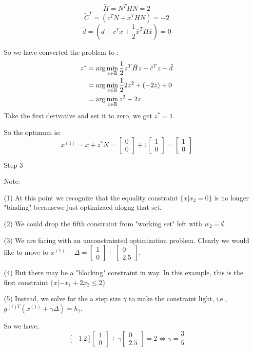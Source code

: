 $$\tilde{H} = N^THN = 2$$
$$\tilde{C}^T = (c^TN + \bar{x}^T HN)= -2$$
$$\tilde{d}= (d+c^Tx + \frac{1}{2}\bar{x}^TH\bar{x})=0$$


So we have converted the problem to :
\begin{align*}
z^* 
&= \arg\min_{z\in\mathbb{R}} \frac{1}{2} z^T\tilde{H}z + \tilde{c}^Tz + \tilde{d}\\
&= \arg\min_{z\in\mathbb{R}} \frac{1}{2}2z^2 + (-2z)+ 0\\
&= \arg\min_{z\in\mathbb{R}} z^2 - 2z
\end{align*}
Take the first derivative and set it to zero, we get $z^* = 1$.

So the optimum is:
\begin{equation*}
x^{(1)}= \bar{x}+ z^*N = 
\begin{bmatrix}
0\\
0
\end{bmatrix}
 + 1
\begin{bmatrix}
1\\
0
\end{bmatrix} = 
\begin{bmatrix}
1\\
0
\end{bmatrix}
\end{equation*}


Step 3

Note:

(1) At this point we recognize that the equality constraint $\{x|x_2=0\}$ is no longer "binding" becausewe just optimizaed alogng that set.

(2) We could drop the fifth constraint from "working set" left with $w_2 =\emptyset$

(3) We are facing with an unconstrainted optimization problem. Clearly we would like to move to $x^{(1)} +\Delta = 
\begin{bmatrix}
1\\
0
\end{bmatrix}
+
\begin{bmatrix}
0\\
2.5
\end{bmatrix}
$.

(4) But there may be a "blocking" constraint in way. In this example, this is the first constraint $\{x|-x_1 +2x_2\leq 2 \}$

(5) Instead, we solve for the a step size $\gamma$ to make the constraint light, i.e., $g^{(i)T}(x^{(1)}+\gamma \Delta) = h_1$. 

So we have,
$$[-1\ 2] 
\begin{bmatrix}
1\\
0
\end{bmatrix}
+
\gamma
\begin{bmatrix}
0\\
2.5
\end{bmatrix}
=
2
\Leftrightarrow
\gamma= \frac{3}{5}
$$

